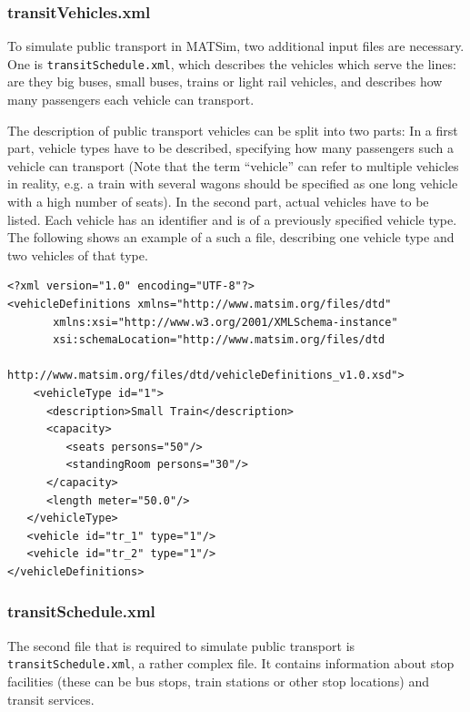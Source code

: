 \subsubsection{transitVehicles.xml}
To simulate public transport in MATSim, two additional input files are necessary. One is \lstinline|transitSchedule.xml|, which describes the vehicles which serve the lines: are they big buses, small buses, trains or light rail vehicles, and describes how many passengers each vehicle can transport.

The description of public transport vehicles can be split into two parts: In a first part, vehicle types have to be described, specifying how many passengers such a vehicle can transport (Note that the term ``vehicle'' can refer to multiple vehicles in reality, e.g. a train with several wagons should be specified as one long vehicle with a high number of seats). In the second part, actual vehicles have to be listed. Each vehicle has an identifier and is of a previously specified vehicle type. The following shows an example of a such a file, describing one vehicle type and two vehicles of that type. 

\begin{lstlisting}
<?xml version="1.0" encoding="UTF-8"?> 
<vehicleDefinitions xmlns="http://www.matsim.org/files/dtd" 
       xmlns:xsi="http://www.w3.org/2001/XMLSchema-instance" 
       xsi:schemaLocation="http://www.matsim.org/files/dtd 
                     http://www.matsim.org/files/dtd/vehicleDefinitions_v1.0.xsd"> 
	<vehicleType id="1"> 
      <description>Small Train</description> 
      <capacity> 
         <seats persons="50"/> 
         <standingRoom persons="30"/> 
      </capacity> 
      <length meter="50.0"/> 
   </vehicleType> 
   <vehicle id="tr_1" type="1"/> 
   <vehicle id="tr_2" type="1"/> 
</vehicleDefinitions>
\end{lstlisting}

\subsubsection{transitSchedule.xml}
The second file that is required to simulate public transport is \lstinline|transitSchedule.xml|, a rather complex file. It contains information about stop facilities (these can be bus stops, train stations or other stop locations) and transit services.

